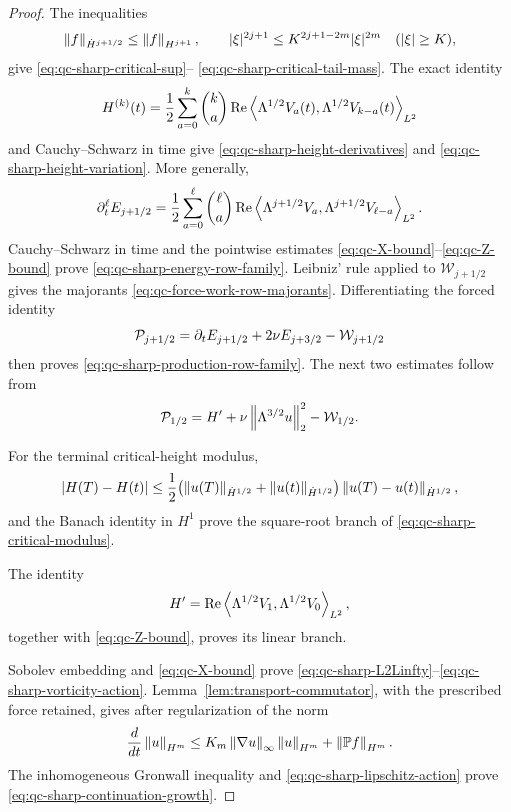 {\begin{proof}
The inequalities
\[
 \left\lVert f\right\rVert_{\dot H^{j+1/2}}\le\left\lVert f\right\rVert_{H^{j+1}},
 \qquad
 |\xi|^{2j+1}\le K^{2j+1-2m}|\xi|^{2m}
 \quad(|\xi|\ge K),
\]
give \eqref{eq:qc-sharp-critical-sup}--%
\eqref{eq:qc-sharp-critical-tail-mass}.  The exact identity
\[
 H^{(k)}(t)=\frac12\sum_{a=0}^{k}\binom ka
 \operatorname{Re}\left\langle \Lambda^{1/2}V_a(t),\Lambda^{1/2}V_{k-a}(t)\right\rangle_{L^2}
\]
and Cauchy--Schwarz in time give
\eqref{eq:qc-sharp-height-derivatives} and
\eqref{eq:qc-sharp-height-variation}.  More generally,
\[
 \partial_t^\ell E_{j+1/2}
 =\frac12\sum_{a=0}^{\ell}\binom\ell a
 \operatorname{Re}\left\langle \Lambda^{j+1/2}V_a,\Lambda^{j+1/2}V_{\ell-a}\right\rangle_{L^2}.
\]
Cauchy--Schwarz in time and the pointwise estimates
\eqref{eq:qc-X-bound}--\eqref{eq:qc-Z-bound} prove
\eqref{eq:qc-sharp-energy-row-family}.  Leibniz' rule applied to
\(\mathcal W_{j+1/2}\) gives the majorants
\eqref{eq:qc-force-work-row-majorants}.  Differentiating the forced identity
\[
 \mathcal P_{j+1/2}=\partial_tE_{j+1/2}+2\nu E_{j+3/2}
 -\mathcal W_{j+1/2}
\]
then proves \eqref{eq:qc-sharp-production-row-family}.  The next two
estimates follow from
\[
 \mathcal P_{1/2}=H'+\nu\left\lVert \Lambda^{3/2}u\right\rVert_2^2
 -\mathcal W_{1/2}.
\]
\begin{samepage}
For the terminal critical-height modulus,
\[
 |H(T)-H(t)|
 \le\frac12\bigl(
 \left\lVert u(T)\right\rVert_{\dot H^{1/2}}+\left\lVert u(t)\right\rVert_{\dot H^{1/2}}
 \bigr)\left\lVert u(T)-u(t)\right\rVert_{\dot H^{1/2}},
\]
and the Banach identity in \(H^1\) prove the square-root branch of
\eqref{eq:qc-sharp-critical-modulus}.
\par
\end{samepage}
The identity
\[
 H'=\operatorname{Re}
 \left\langle \Lambda^{1/2}V_1,\Lambda^{1/2}V_0\right\rangle_{L^2},
\]
together with \eqref{eq:qc-Z-bound}, proves its linear branch.

Sobolev embedding and \eqref{eq:qc-X-bound} prove
\eqref{eq:qc-sharp-L2Linfty}--\eqref{eq:qc-sharp-vorticity-action}.
Lemma~\ref{lem:transport-commutator}, with the prescribed force retained,
gives after regularization of the norm
\[
 \frac d{dt}\left\lVert u\right\rVert_{H^m}
 \le K_m\left\lVert \nabla u\right\rVert_\infty\left\lVert u\right\rVert_{H^m}
 +\left\lVert \mathbb P f\right\rVert_{H^m}.
\]
The inhomogeneous Gronwall inequality and \eqref{eq:qc-sharp-lipschitz-action} prove
\eqref{eq:qc-sharp-continuation-growth}.
\end{proof}
}

